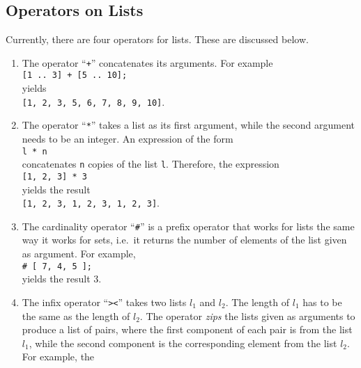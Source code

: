 \subsection{Operators on Lists}
Currently, there are four operators for lists.  These are discussed below.
\begin{enumerate}
\item The operator ``\texttt{+}'' concatenates its arguments.  For example
      \\[0.2cm]
      \hspace*{1.3cm}
      \texttt{[1 .. 3] + [5 .. 10];}
      \\[0.2cm]
      yields 
      \\[0.2cm]
      \hspace*{1.3cm}
      \texttt{[1, 2, 3, 5, 6, 7, 8, 9, 10]}.
\item The operator ``\texttt{*}'' takes a list as its first argument,  while the second argument
      needs to be an integer.  An expression of the form 
      \\[0.2cm]
      \hspace*{1.3cm}
      \texttt{l * n}
      \\[0.2cm]
      concatenates \texttt{n} copies of the list \texttt{l}.  Therefore, the expression
      \\[0.2cm]
      \hspace*{1.3cm}
      \texttt{[1, 2, 3] * 3}
      \\[0.2cm]
      yields the result
      \\[0.2cm]
      \hspace*{1.3cm}
      \texttt{[1, 2, 3, 1, 2, 3, 1, 2, 3]}.
\item The cardinality operator ``\texttt{\#}'' is a prefix operator that works for lists the same
      way it works for sets, i.e.~it returns the number of elements of the list given as argument.  For example,
      \\[0.2cm]
      \hspace*{1.3cm}
      \texttt{\# [ 7, 4, 5 ];}
      \\[0.2cm]
      yields the result $3$.
\item The infix operator ``\texttt{><}'' takes two lists $l_1$ and $l_2$.  The length of $l_1$ has
      to be the same as the length of $l_2$.  The operator \emph{zips} the lists given as arguments
      to produce a list of pairs, where the first component of each  pair is from the list $l_1$,
      while the second component is the corresponding element from the list $l_2$.  For example, the

\end{enumerate}
